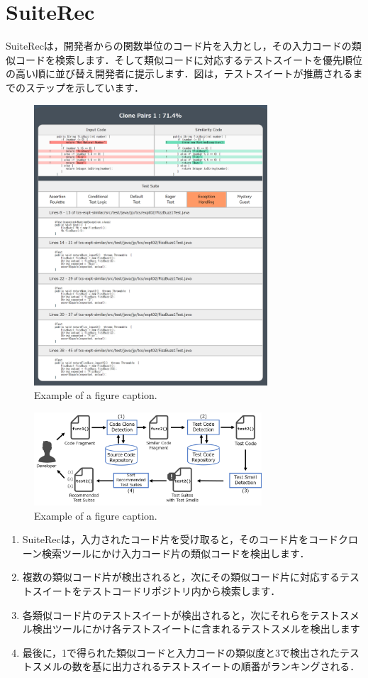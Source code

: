 \documentclass[conference]{IEEEtran}
\begin{document}
\section{SuiteRec}
SuiteRecは，開発者からの関数単位のコード片を入力とし，その入力コードの類似コードを検索します．そして類似コードに対応するテストスイートを優先順位の高い順に並び替え開発者に提示します．図は，テストスイートが推薦されるまでのステップを示しています．

\begin{figure}[htbp]
\centerline{\includegraphics[width=8.7cm]{SuiteRec2.pdf}}
\caption{Example of a figure caption.}
\label{fig}
\end{figure}

\begin{figure}[htbp]
\centerline{\includegraphics[width=8.5cm]{SuiteRec-OutLine.pdf}}
\caption{Example of a figure caption.}
\label{fig}
\end{figure}

\begin{enumerate}
\renewcommand{\labelenumi}{(\arabic{enumi})}
\item SuiteRecは，入力されたコード片を受け取ると，そのコード片をコードクローン検索ツールにかけ入力コード片の類似コードを検出します．
\item 複数の類似コード片が検出されると，次にその類似コード片に対応するテストスイートをテストコードリポジトリ内から検索します．
\item 各類似コード片のテストスイートが検出されると，次にそれらをテストスメル検出ツールにかけ各テストスイートに含まれるテストスメルを検出します
\item 最後に，1で得られた類似コードと入力コードの類似度と3で検出されたテストスメルの数を基に出力されるテストスイートの順番がランキングされる．
\end{enumerate}
\end{document}
